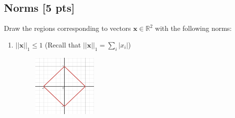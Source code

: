 \documentclass[a4paper]{article}
\theoremstyle{definition}
\newcommand{\RR}{\mathbb{R}}
\newenvironment{soln}{
	\leavevmode\color{blue}\ignorespaces
}{}
\begin{document}
	\subsection{Norms [5 pts]}
	Draw the regions corresponding to vectors $\mathbf{x}\in\RR^2$ with the following norms:
	\begin{enumerate}
		\item 	$||\mathbf{x}||_1\leq 1$ (Recall that $||\mathbf{x}||_1 = \sum_i |x_i|$) \\

	\begin{soln}
	   \begin{figure}[ht!]
	        \centering
	        \includegraphics[width=0.3\textwidth]{hw1/norm1.png}  
	        \captionsetup{labelformat=empty}
	        \caption{}
	        \label{fig:my_label}
	    \end{figure}
	\end{soln}
		

\end{enumerate}
\end{document}
